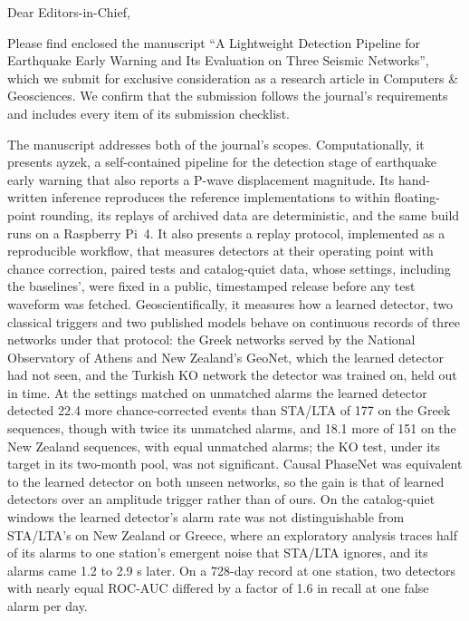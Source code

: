 Dear Editors-in-Chief,

\medskip
Please find enclosed the manuscript ``A Lightweight Detection Pipeline for Earthquake
Early Warning and Its Evaluation on Three Seismic Networks'', which we
submit for exclusive consideration as a research article in Computers \&
Geosciences. We confirm that the submission follows the journal's requirements and
includes every item of its submission checklist.

\medskip
The manuscript addresses both of the journal's scopes. Computationally, it presents
ayzek, a self-contained pipeline for the detection stage of earthquake early
warning that also reports a P-wave displacement magnitude. Its
hand-written inference reproduces the reference implementations to within floating-point
rounding, its replays of archived data are deterministic, and the same build runs on a
Raspberry Pi~4. It also presents a replay protocol, implemented as a reproducible
workflow, that measures detectors at their operating point with chance correction,
paired tests and catalog-quiet data, whose settings, including the baselines', were
fixed in a public, timestamped release before any test waveform was fetched. Geoscientifically, it measures how a learned detector, two classical
triggers and two published models behave on continuous records of three networks
under that protocol: the Greek networks served by the National Observatory of
Athens and New Zealand's GeoNet, which the learned detector had not seen, and the Turkish KO network
the detector was trained on, held out in time. At the settings matched on unmatched
alarms the learned detector detected 22.4 more chance-corrected events than STA/LTA of
177 on the Greek sequences, though with twice its unmatched alarms, and 18.1 more of
151 on the New Zealand sequences, with equal unmatched alarms; the KO test, under its
target in its two-month pool, was not significant. Causal PhaseNet was equivalent to
the learned detector on both unseen networks, so the gain is that of learned detectors
over an amplitude trigger rather than of ours. On the catalog-quiet windows the learned
detector's alarm rate was not distinguishable from STA/LTA's on New Zealand or Greece,
where an exploratory analysis traces half of its alarms to one station's emergent
noise that STA/LTA ignores, and its alarms came 1.2 to 2.9 s later. On a 728-day
record at one station, two detectors with nearly equal ROC-AUC differed by a factor of 1.6 in
recall at one false alarm per day.

